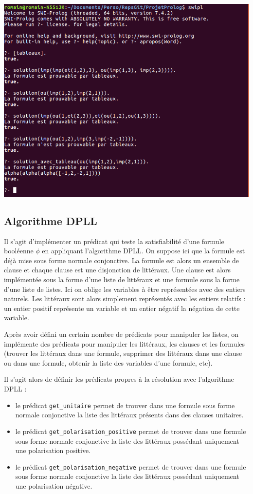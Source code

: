 \documentclass[12pt,a4paper]{article}
\begin{document}
\begin{center}
\includegraphics[width = 400pt]{SolutionTableaux.png}
\end{center}

\subsection{Algorithme DPLL}
Il s'agit d'implémenter un prédicat qui teste la satisfiabilité d'une formule booléenne $\phi$ en appliquant l'algorithme DPLL. On suppose ici que la formule est déjà mise sous forme normale conjonctive. La formule est alors un ensemble de clause et chaque clause est une disjonction de littéraux.  Une clause est alors implémentée sous la forme d'une liste de littéraux et une formule sous la forme d'une liste de listes. Ici on oblige les variables à être représentées avec des entiers naturels. Les littéraux sont alors simplement représentés avec les entiers relatifs : un entier positif représente un variable et un entier négatif la négation de cette variable.

Après avoir défini un certain nombre de prédicats pour manipuler les listes, on implémente des prédicats pour manipuler les littéraux, les clauses et les formules (trouver les littéraux dans une formule, supprimer des littéraux dans une clause ou dans une formule, obtenir la liste des variables d'une formule, etc).

Il s'agit alors de définir les prédicats propres à la résolution avec l'algorithme DPLL :
\begin{itemize}
\item le prédicat \texttt{get\_unitaire} permet de trouver dans une formule sous forme normale conjonctive la liste des littéraux présents dans des clauses unitaires.
\item le prédicat \texttt{get\_polarisation\_positive} permet de trouver dans une formule sous forme normale conjonctive la liste des littéraux possédant uniquement une polarisation positive.
\item le prédicat \texttt{get\_polarisation\_negative} permet de trouver dans une formule sous forme normale conjonctive la liste des littéraux possédant uniquement une polarisation négative.
\end{itemize}
\end{document}
